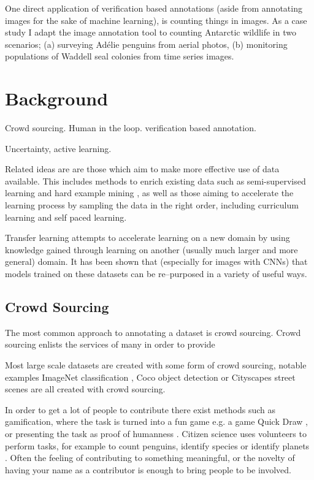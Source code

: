One direct application of verification based annotations (aside from annotating images for the sake of machine learning), is counting things in images. As a case study I adapt the image annotation tool to counting Antarctic wildlife in two scenarios; (a) surveying Adélie penguins from aerial photos, (b) monitoring populations of Waddell seal colonies from time series images.





\section {Background}

Crowd sourcing. Human in the loop. verification based annotation.

Uncertainty, active learning.

Related ideas are are those which aim to make more effective use of data available. This includes methods to enrich existing data such as semi-supervised learning and hard example mining \cite{Jin2018, Yu2018, Canevet2014}, as well as those aiming to accelerate the learning process by sampling the data in the right order, including curriculum learning and self paced learning.

Transfer learning attempts to accelerate learning on a new domain by using knowledge gained through learning on another (usually much larger and more general) domain. It has been shown that (especially for images with \gls{CNN}s) that models trained on these datasets can be re--purposed in a variety of useful ways.


\subsection {Crowd Sourcing}

The most common approach to annotating a dataset is crowd sourcing. Crowd sourcing enlists the services of many in order to provide 

Most large scale datasets are created with some form of crowd sourcing, notable examples ImageNet classification \cite{JiaDeng2009}, Coco object detection \cite{Lin2014} or Cityscapes street scenes \cite{Cordts2016} are all created with crowd sourcing. 

In order to get a lot of people to contribute there exist methods such as gamification, where the task is turned into a fun game  e.g. a game Quick Draw \cite{Ha2017}, or presenting the task as proof of humanness \cite{Goodfellow2013a}. Citizen science uses volunteers to perform tasks, for example to count penguins, identify species or identify planets \cite{Simpson2014, Masters2016}. Often the feeling of contributing to something meaningful, or the novelty of having your name as a contributor is enough to bring people to be involved.

